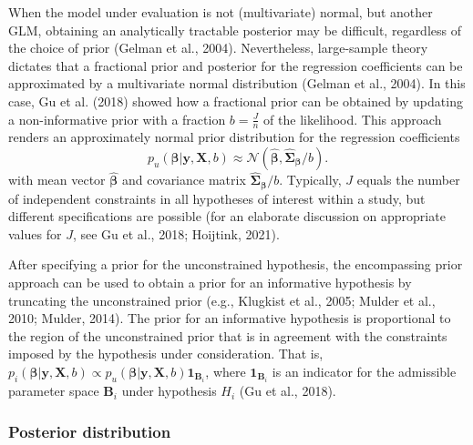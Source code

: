 \documentclass[
]{interact}
\begin{document}
When the model under evaluation is not (multivariate) normal, but
another GLM, obtaining an analytically tractable posterior may be
difficult, regardless of the choice of prior (Gelman et al., 2004).
Nevertheless, large-sample theory dictates that a fractional prior and
posterior for the regression coefficients can be approximated by a
multivariate normal distribution (Gelman et al., 2004). In this case, Gu
et al. (2018) showed how a fractional prior can be obtained by updating
a non-informative prior with a fraction \(b = \frac{J}{n}\) of the
likelihood. This approach renders an approximately normal prior
distribution for the regression coefficients \[
p_u(\boldsymbol{\beta} | \boldsymbol{y}, \boldsymbol{X}, b) \approx 
\mathcal{N}(\boldsymbol{\hat{\beta}}, \boldsymbol{\hat{\Sigma}_\beta} / b).
\] with mean vector \(\boldsymbol{\hat{\beta}}\) and covariance matrix
\(\boldsymbol{\hat{\Sigma}_{\beta}}/b\). Typically, \(J\) equals the
number of independent constraints in all hypotheses of interest within a
study, but different specifications are possible (for an elaborate
discussion on appropriate values for \(J\), see Gu et al., 2018;
Hoijtink, 2021).

After specifying a prior for the unconstrained hypothesis, the
encompassing prior approach can be used to obtain a prior for an
informative hypothesis by truncating the unconstrained prior (e.g.,
Klugkist et al., 2005; Mulder et al., 2010; Mulder, 2014). The prior for
an informative hypothesis is proportional to the region of the
unconstrained prior that is in agreement with the constraints imposed by
the hypothesis under consideration. That is,
\(p_i(\boldsymbol{\beta} | \boldsymbol{y}, \boldsymbol{X}, b) \propto p_u(\boldsymbol{\beta} | \boldsymbol{y}, \boldsymbol{X}, b)\boldsymbol{1}_{\boldsymbol{B}_i}\),
where \(\boldsymbol{1}_{\boldsymbol{B}_i}\) is an indicator for the
admissible parameter space \(\boldsymbol{B}_i\) under hypothesis \(H_i\)
(Gu et al., 2018).

\hypertarget{posterior-distribution}{%
\subsubsection{Posterior distribution}\label{posterior-distribution}}
\end{document}
